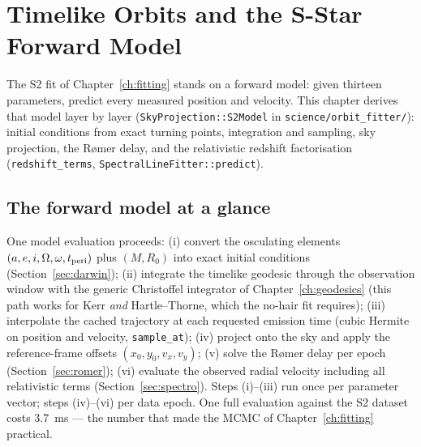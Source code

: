 \chapter{Timelike Orbits and the S-Star Forward Model}
\label{ch:sstar}

The S2 fit of Chapter~\ref{ch:fitting} stands on a forward model: given
thirteen parameters, predict every measured position and velocity. This
chapter derives that model layer by layer
(\texttt{SkyProjection::S2Model} in \texttt{science/orbit\_fitter/}):
initial conditions from exact turning points, integration and sampling,
sky projection, the R{\o}mer delay, and the relativistic redshift
factorisation (\texttt{redshift\_terms},
\texttt{SpectralLineFitter::predict}).

\section{The forward model at a glance}
\label{sec:forwardmodel}

One model evaluation proceeds: (i) convert the osculating elements
$(a, e, i, \Omega, \omega, t_{\rm peri})$ plus $(M, R_0)$ into exact
initial conditions (Section~\ref{sec:darwin}); (ii) integrate the
timelike geodesic through the observation window with the generic
Christoffel integrator of Chapter~\ref{ch:geodesics} (this path works
for Kerr \emph{and} Hartle--Thorne, which the no-hair fit requires);
(iii) interpolate the cached trajectory at each requested emission time
(cubic Hermite on position and velocity, \texttt{sample\_at});
(iv) project onto the sky and apply the reference-frame offsets
$(x_0, y_0, v_x, v_y)$; (v) solve the R{\o}mer delay per epoch
(Section~\ref{sec:romer}); (vi) evaluate the observed radial velocity
including all relativistic terms (Section~\ref{sec:spectro}). Steps
(i)--(iii) run once per parameter vector; steps (iv)--(vi) per data
epoch. One full evaluation against the S2 dataset costs 3.7~ms — the
number that made the MCMC of Chapter~\ref{ch:fitting} practical.

